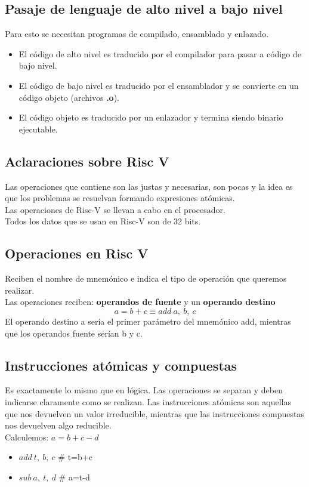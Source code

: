 \documentclass[10pt,a4paper]{article}
\begin{document}
\subsection*{Pasaje de lenguaje de alto nivel a bajo nivel}
Para esto se necesitan programas de compilado, ensamblado y enlazado.
\begin{itemize}
    \item El código de alto nivel es traducido por el compilador para pasar a código de bajo nivel.
    \item El código de bajo nivel es traducido por el ensamblador y se convierte en un código objeto (archivos \textbf{.o}).
    \item El código objeto es traducido por un enlazador y termina siendo binario ejecutable.
\end{itemize}
\subsection*{Aclaraciones sobre Risc V}
Las operaciones que contiene son las justas y necesarias, son pocas y la idea es que los problemas se resuelvan formando expresiones atómicas. \\
Las operaciones de Risc-V se llevan a cabo en el procesador. \\
Todos los datos que se usan en Risc-V son de 32 bits.
\subsection*{Operaciones en Risc V}
Reciben el nombre de mnemónico e indica el tipo de operación que queremos realizar. \\
Las operaciones reciben: \textbf{operandos de fuente} y un \textbf{operando destino}
\[a = b + c \equiv add \ a,\ b,\ c\]
El operando destino a sería el primer parámetro del mnemónico add, mientras que los operandos fuente serían b y c.
\subsection*{Instrucciones atómicas y compuestas}
Es exactamente lo mismo que en lógica. Las operaciones se separan y deben indicarse claramente como se realizan.
Las instrucciones atómicas son aquellas que nos devuelven un valor irreducible, mientras que las instrucciones compuestas nos devuelven algo reducible. \\
Calculemos: \(a = b + c - d\)
\begin{itemize}
    \item \(add \ t,\ b,\ c\) \# t=b+c
    \item \(sub \ a,\ t, \ d\) \# a=t-d
\end{itemize}
\end{document}
